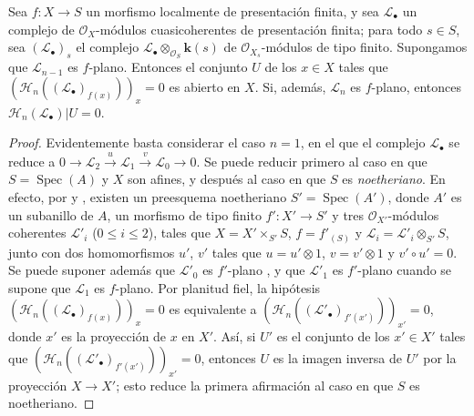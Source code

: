 \begin{proposition}[12.3.3]
\label{IV.12.3.3}
Sea $f:X\to S$ un morfismo localmente de presentación finita, y sea $\mathcal L_\bullet$ un complejo de $\mathcal O_X$-módulos cuasicoherentes de presentación finita; para todo $s\in S$, sea $(\mathcal L_\bullet)_s$ el complejo $\mathcal L_\bullet\otimes_{\mathcal O_S}\boldsymbol{k}(s)$ de $\mathcal O_{X_s}$-módulos de tipo finito.
Supongamos que $\mathcal L_{n-1}$ es $f$-plano.
Entonces el conjunto $U$ de los $x\in X$ tales que $(\mathcal H_n((\mathcal L_\bullet)_{f(x)}))_x=0$ es abierto en $X$.
Si, además, $\mathcal L_n$ es $f$-plano, entonces $\mathcal H_n(\mathcal L_\bullet)|U=0$.
\end{proposition}

\begin{proof}
Evidentemente basta considerar el caso $n=1$, en el que el complejo $\mathcal L_\bullet$ se reduce a
$0\to\mathcal L_2\xrightarrow{u}\mathcal L_1\xrightarrow{v}\mathcal L_0\to0$.
Se puede reducir primero al caso en que $S=\operatorname{Spec}(A)$ y $X$
son afines, y después al caso en que $S$ es \emph{noetheriano}. En efecto, por  y , existen un preesquema noetheriano $S'=\operatorname{Spec}(A')$, donde $A'$ es un subanillo de $A$, un morfismo de tipo finito $f':X'\to S'$ y tres $\mathcal O_{X'}$-módulos coherentes $\mathcal L'_i$ ($0\leq i\leq2$), tales que
$X=X'\times_{S'}S$, $f=f'_{(S)}$ y $\mathcal L_i=\mathcal L'_i\otimes_{S'}S$, junto con dos homomorfismos $u'$, $v'$ tales que $u=u'\otimes1$, $v=v'\otimes1$ y $v'\circ u'=0$.
Se puede suponer además que $\mathcal L'_0$ es $f'$-plano , y que $\mathcal L'_1$ es $f'$-plano cuando se supone que $\mathcal L_1$ es $f$-plano.
Por planitud fiel, la hipótesis
$(\mathcal H_n((\mathcal L_\bullet)_{f(x)}))_x=0$
es equivalente a
$(\mathcal H_n((\mathcal L'_\bullet)_{f'(x')}))_{x'}=0$,
donde $x'$ es la proyección de $x$ en $X'$.
Así, si $U'$ es el conjunto de los $x'\in X'$ tales que
$(\mathcal H_n((\mathcal L'_\bullet)_{f'(x')}))_{x'}=0$,
entonces $U$ es la imagen inversa de $U'$ por la proyección $X\to X'$; esto reduce la primera afirmación al caso en que $S$ es noetheriano.


\end{proof}
